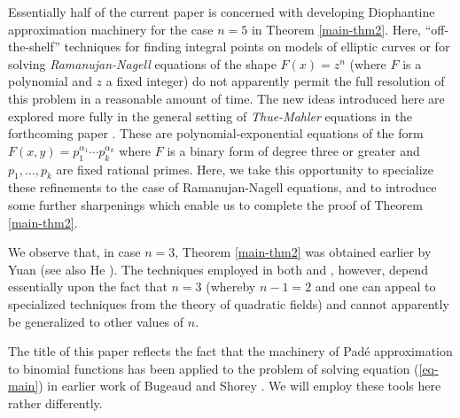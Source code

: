Essentially half of the current paper is concerned with developing Diophantine approximation machinery for the case $n=5$ in Theorem \ref{main-thm2}. Here, ``off-the-shelf'' techniques for finding integral points on models of elliptic curves or for solving {\it Ramanujan-Nagell} equations of the shape $F(x)=z^n$ (where $F$ is a polynomial and $z$ a fixed integer) do not apparently permit the full resolution of this problem in a reasonable amount of time. The new ideas introduced here are explored more fully in the general setting of {\it Thue-Mahler} equations in the forthcoming paper  \cite{GhKaMaSi}. These are polynomial-exponential equations of the form $F(x,y)=p_1^{\alpha_1} \cdots p_k^{\alpha_k}$ where $F$ is a binary form of degree three or greater and $p_1, \ldots, p_k$ are fixed rational primes. Here, we take this opportunity to specialize these refinements to the case of Ramanujan-Nagell equations, and to introduce some further sharpenings which enable us to complete the proof of Theorem \ref{main-thm2}.

We observe that, in case $n=3$, Theorem \ref{main-thm2} was obtained earlier by Yuan \cite{Yu} (see also He \cite{He}).  The techniques employed in both \cite{He} and \cite{Yu}, however, depend essentially upon the fact that $n=3$ (whereby $n-1=2$ and one can appeal to specialized techniques from the theory of quadratic fields) and cannot apparently be generalized to other values of $n$.

The title of this paper reflects the fact that the machinery of Pad\'e approximation to binomial functions has been applied to the problem of solving equation (\ref{eq-main}) in earlier work of Bugeaud and Shorey \cite{BuSh}. We will employ these tools  here rather differently.

